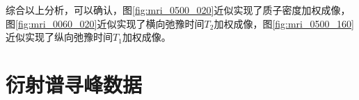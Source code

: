 \documentclass{thuemp}
\begin{document}
综合以上分析，可以确认，图\ref{fig:mri_0500_020}近似实现了质子密度加权成像，图\ref{fig:mri_0060_020}近似实现了横向弛豫时间$T_2$加权成像，图\ref{fig:mri_0500_160}近似实现了纵向弛豫时间$T_1$加权成像。




\renewcommand\refname{\heiti\wuhao\centerline{参考文献}\global\def\refname{参考文献}}
\vskip 12pt


\let\OLDthebibliography\thebibliography
\renewcommand\thebibliography[1]{
  \OLDthebibliography{#1}
  \setlength{\parskip}{0pt}
  \setlength{\itemsep}{0pt plus 0.3ex}
}

{
\renewcommand{\baselinestretch}{0.9}
\liuhao


}

\appendix
\section{衍射谱寻峰数据}
\end{document}
